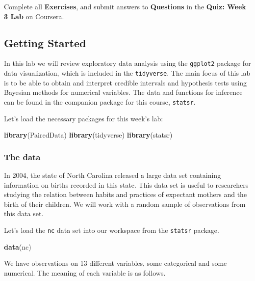 \documentclass[]{article}
\title{}
\author{}
\date{}
\newenvironment{Shaded}{\begin{snugshade}}{\end{snugshade}}
\newcommand{\KeywordTok}[1]{\textcolor[rgb]{0.13,0.29,0.53}{\textbf{#1}}}
\newcommand{\NormalTok}[1]{#1}
\begin{document}
Complete all \textbf{Exercises}, and submit answers to
\textbf{Questions} in the \textbf{Quiz: Week 3 Lab} on Coursera.

\subsection{Getting Started}\label{getting-started}

In this lab we will review exploratory data analysis using the
\texttt{ggplot2} package for data visualization, which is included in
the \texttt{tidyverse}. The main focus of this lab is to be able to
obtain and interpret credible intervals and hypothesis tests using
Bayesian methods for numerical variables. The data and functions for
inference can be found in the companion package for this course,
\texttt{statsr}.

Let's load the necessary packages for this week's lab:

\begin{Shaded}
\begin{Highlighting}[]
\KeywordTok{library}\NormalTok{(PairedData)}
\KeywordTok{library}\NormalTok{(tidyverse)}
\KeywordTok{library}\NormalTok{(statsr)}
\end{Highlighting}
\end{Shaded}

\subsubsection{The data}\label{the-data}

In 2004, the state of North Carolina released a large data set
containing information on births recorded in this state. This data set
is useful to researchers studying the relation between habits and
practices of expectant mothers and the birth of their children. We will
work with a random sample of observations from this data set.

Let's load the \texttt{nc} data set into our workspace from the
\texttt{statsr} package.

\begin{Shaded}
\begin{Highlighting}[]
\KeywordTok{data}\NormalTok{(nc)}
\end{Highlighting}
\end{Shaded}

We have observations on 13 different variables, some categorical and
some numerical. The meaning of each variable is as follows.
\end{document}
